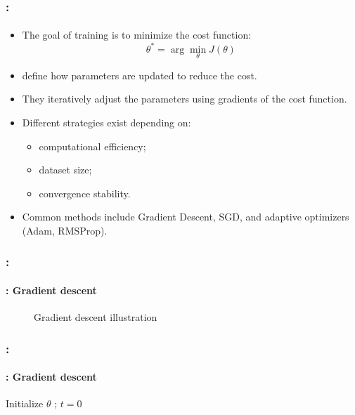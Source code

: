 \documentclass[xcolor=table]{beamer}
\begin{document}
\begin{frame}
	\frametitle{\insertshortsubtitle: \insertsection}
	\framesubtitle{\insertsubsection}
	
	\begin{itemize}
		\item The goal of training is to minimize the cost function:
		\[
		\theta^* = \arg\min_{\theta} J(\theta)
		\]
		
		\item {} define how parameters are updated to reduce the cost.
		
		\item They iteratively adjust the parameters using gradients of the cost function.
		
		\item Different strategies exist depending on:
		\begin{itemize}
			\item computational efficiency;
			\item dataset size;
			\item convergence stability.
		\end{itemize}
		
		\item Common methods include Gradient Descent, SGD, and adaptive optimizers (Adam, RMSProp).
	\end{itemize}
	
\end{frame}

\begin{frame}
	\frametitle{\insertshortsubtitle: \insertsection}
	\framesubtitle{\insertsubsection: Gradient descent}

	\begin{figure}
		\caption{Gradient descent illustration \cite{2020-calin}}
	\end{figure}

\end{frame}

\begin{frame}
	\frametitle{\insertshortsubtitle: \insertsection}
	\framesubtitle{\insertsubsection: Gradient descent}

	\begin{algorithm}[H]
		\KwResult{$ \theta $}
		Initialize $ \theta $ ; $ t = 0 $\;
		\caption{Gradient descent}
	\end{algorithm}

\end{frame}
\end{document}
